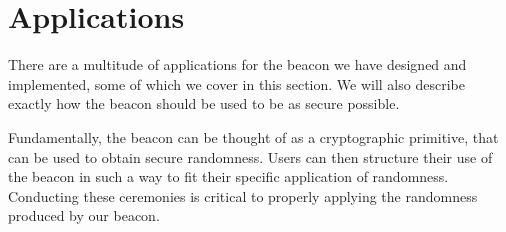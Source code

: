 \section{Applications}
There are a multitude of applications for the beacon we have designed and implemented, some of which we cover in this section. We will also describe exactly how the beacon should be used to be as secure possible.

Fundamentally, the beacon can be thought of as a cryptographic primitive, that can be used to obtain secure randomness. Users can then structure their use of the beacon in such a way to fit their specific application of randomness. Conducting these ceremonies is critical to properly applying the randomness produced by our beacon.